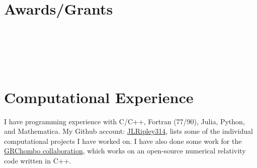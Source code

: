 \documentclass{my_cv}
\begin{document}
\section{Awards/Grants}
\noindent
{}
\\ \\
\\ \\
\section{Computational Experience}
   I have programming experience with C/C++, Fortran (77/90), Julia, Python,
   and Mathematica.
   My Github account: \href{https://github.com/JLRipley314}{JLRipley314},
   lists some of the individual computational projects I have worked on.
   I have also done some work for the
   \href{https://www.grchombo.org/}{GRChombo collaboration}, 
   which works on an open-source numerical relativity code written in C++.
\end{document}
